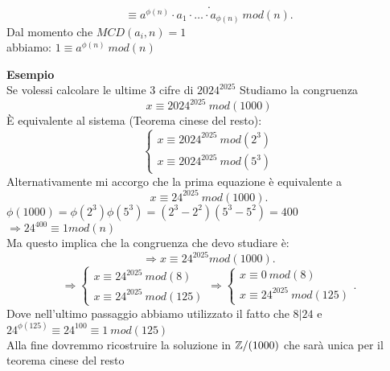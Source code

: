 \documentclass[12px]{article}
\begin{document}
{\begin{dimo}
\[			.\] 
			\[
				\equiv a^{\phi(n)}\cdot a_1\cdot\ldots\cdot a_{\phi(n)} \ mod(n)
			.\] 
			Dal momento che $MCD(a_i,n) = 1$\\
			abbiamo:  $1\equiv a^{\phi(n)}\ mod(n)$
	 \end{dimo}
	 \textbf{Esempio}\\
	 Se volessi calcolare le ultime $3$ cifre di $2024^{2025}$ Studiamo la congruenza  \[x\equiv 2024^{2025} \ mod(1000)\]
	 È equivalente al sistema (Teorema cinese del resto):\[
	 \begin{cases}
	 x\equiv 2024^{2025} \ mod(2^3)\\
	 x\equiv 2024^{2025} \ mod(5^3)
 \end{cases}\]
 Alternativamente mi accorgo che la prima equazione è equivalente a
 \[
	 x\equiv 24^{2025} \ mod(1000)
 .\] 
 $\phi(1000) = \phi(2^3)\phi(5^3) = (2^3 - 2^2)(5^3-5^2) = 400$\\
 $ \Rightarrow 24^{400} \equiv 1 mod(n)$\\
 Ma questo implica che la congruenza che devo studiare è:
 \[
 \Rightarrow x\equiv 24^{2025} mod(1000)
 .\] 
 \[
 \Rightarrow \begin{cases}
	 x\equiv 24^{2025}\ mod(8)\\
	 x\equiv 24^{2025}\ mod(125)
 \end{cases} \Rightarrow \begin{cases}
 	x\equiv 0\ mod(8)\\
	x\equiv 24^{2025} \ mod(125)
 \end{cases}
 .\] 
 Dove nell'ultimo passaggio abbiamo utilizzato il fatto che $8|24$ e $24^{\phi(125)}\equiv 24^{100}\equiv 1\ mod(125)$\\
 Alla fine dovremmo ricostruire la soluzione in $\mathbb{Z}/(1000)$ che sarà unica per il teorema cinese del resto\newpage
}
\end{document}
